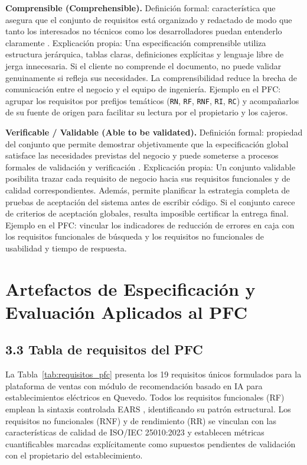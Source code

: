 \documentclass[onecolumn,12pt]{IEEEtran}
\begin{document}
	\textbf{Comprensible (Comprehensible).} Definici\'on formal: caracter\'istica que asegura que el conjunto de requisitos est\'a organizado y redactado de modo que tanto los interesados no t\'ecnicos como los desarrolladores puedan entenderlo claramente \cite{iso29148,pohl2025}. Explicaci\'on propia: Una especificaci\'on comprensible utiliza estructura jer\'arquica, tablas claras, definiciones expl\'icitas y lenguaje libre de jerga innecesaria. Si el cliente no comprende el documento, no puede validar genuinamente si refleja sus necesidades. La comprensibilidad reduce la brecha de comunicaci\'on entre el negocio y el equipo de ingenier\'ia. Ejemplo en el PFC: agrupar los requisitos por prefijos tem\'aticos (\texttt{RN}, \texttt{RF}, \texttt{RNF}, \texttt{RI}, \texttt{RC}) y acompa\~narlos de su fuente de origen para facilitar su lectura por el propietario y los cajeros.
	
	\textbf{Verificable / Validable (Able to be validated).} Definici\'on formal: propiedad del conjunto que permite demostrar objetivamente que la especificaci\'on global satisface las necesidades previstas del negocio y puede someterse a procesos formales de validaci\'on y verificaci\'on \cite{iso29148,swebok4}. Explicaci\'on propia: Un conjunto validable posibilita trazar cada requisito de negocio hacia sus requisitos funcionales y de calidad correspondientes. Adem\'as, permite planificar la estrategia completa de pruebas de aceptaci\'on del sistema antes de escribir c\'odigo. Si el conjunto carece de criterios de aceptaci\'on globales, resulta imposible certificar la entrega final. Ejemplo en el PFC: vincular los indicadores de reducci\'on de errores en caja con los requisitos funcionales de b\'usqueda y los requisitos no funcionales de usabilidad y tiempo de respuesta.
	
	\section{Artefactos de Especificaci\'on y Evaluaci\'on Aplicados al PFC}
	
	\subsection{3.3 Tabla de requisitos del PFC}
	
	La Tabla~\ref{tab:requisitos_pfc} presenta los 19 requisitos \'unicos formulados para la plataforma de ventas con m\'odulo de recomendaci\'on basado en IA para establecimientos el\'ectricos en Quevedo. Todos los requisitos funcionales (RF) emplean la sintaxis controlada EARS \cite{mavin2009}, identificando su patr\'on estructural. Los requisitos no funcionales (RNF) y de rendimiento (RR) se vinculan con las caracter\'isticas de calidad de ISO/IEC 25010:2023 \cite{iso25010} y establecen m\'etricas cuantificables marcadas expl\'icitamente como supuestos pendientes de validaci\'on con el propietario del establecimiento.
	
\end{document}

